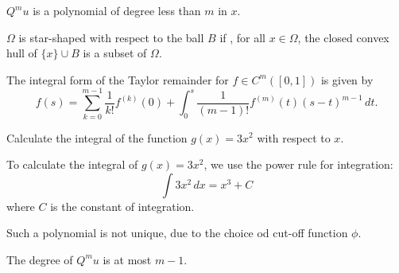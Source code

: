 \documentclass{article}
\begin{document}
\begin{claim}[xxx]
    $Q^m u$ is a polynomial of degree less than $m$ in $x$.
\end{claim}


\begin{definition}[xxx]
    $\Omega$ is star-shaped with respect to the ball $B$ if , for all $x \in \Omega$, the closed convex hull of $\{x\} \cup B$ is a subset of $\Omega$.
\end{definition}


\begin{example}[xxx]
    The integral form of the Taylor remainder for $f \in C^m([0,1])$ is given by
    \begin{equation*}
        f(s) = \sum_{k=0}^{m-1}\frac{1}{k!} f^{(k)}(0) + \int_0^s \frac{1}{(m-1)!} f^{(m)}(t)(s-t)^{m-1}\,dt.
    \end{equation*}
\end{example}


\begin{problem}[xxx]
Calculate the integral of the function $g(x) = 3x^2$ with respect to $x$.
\end{problem}
\begin{solution}[xxx]
    To calculate the integral of $g(x) = 3x^2$, we use the power rule for integration:
    \[
        \int 3x^2 \, dx = x^3 + C
    \]
    where $C$ is the constant of integration.
\end{solution}


\begin{remark}[xxx]
    Such a polynomial is not unique, due to the choice od cut-off function $\phi$.
\end{remark}


\begin{note}[xxx]
    The degree of $Q^m u$ is at most $m-1$.
\end{note}
\end{document}
